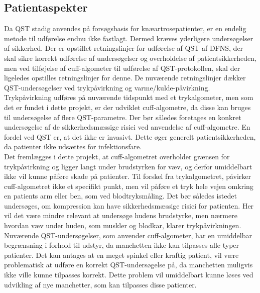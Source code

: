 \subsection{Patientaspekter} \label{Patient_aspekt} %
Da QST stadig anvendes på forsøgsbasis for knæartrosepatienter, er en endelig metode til udførelse endnu ikke fastlagt. Dermed kræves yderligere undersøgelser af sikkerhed. Der er opstillet retningslinjer for udførelse af QST af DFNS, der skal sikre korrekt udførelse af undersøgelser og overholdelse af patientsikkerheden, men ved tilføjelse af cuff-algometer til udførelse af QST-protokollen, skal der ligeledes opstilles retningslinjer for denne. De nuværende retningslinjer dækker QST-undersøgelser ved trykpåvirkning og varme/kulde-påvirkning. Trykpåvirkning udføres på nuværende tidspunkt med et trykalgometer, men som det er fundet i dette projekt, er der udviklet cuff-algometre, da disse kan bruges til undersøgelse af flere QST-parametre. Der bør således foretages en konkret undersøgelse af de sikkerhedsmæssige risici ved anvendelse af cuff-algometre. En fordel ved QST er, at det ikke er invasivt. Dette øger generelt patientsikkerheden, da patienter ikke udsættes for infektionsfare. \\
Det fremlægges i dette projekt, at cuff-algometret overholder grænsen for trykpåvirkning og ligger langt under brudstyrken for væv, og derfor umiddelbart ikke vil kunne påføre skade på patienter. Til forskel fra trykalgometret, påvirker cuff-algometret ikke et specifikt punkt, men vil påføre et tryk hele vejen omkring en patients arm eller ben, som ved blodtryksmåling. Det bør således istedet undersøges, om kompression kan have sikkerhedsmæssige risici for patienten. Her vil det være mindre relevant at undersøge hudens brudstyrke, men nærmere hvordan væv under huden, som muskler og blodkar, klarer trykpåvirkningen. \\
Nuværende QST-undersøgelser, som anvender cuff-algometer, har en umiddelbar begrænsning i forhold til udstyr, da manchetten ikke kan tilpasses alle typer patienter. Det kan antages at en meget spinkel eller kraftig patient, vil være problematisk at udføre en korrekt QST-undersøgelse på, da manchetten muligvis ikke ville kunne tilpasses korrekt. 
Dette problem vil umiddelbart kunne løses ved udvikling af nye manchetter, som kan tilpasses disse patienter.


